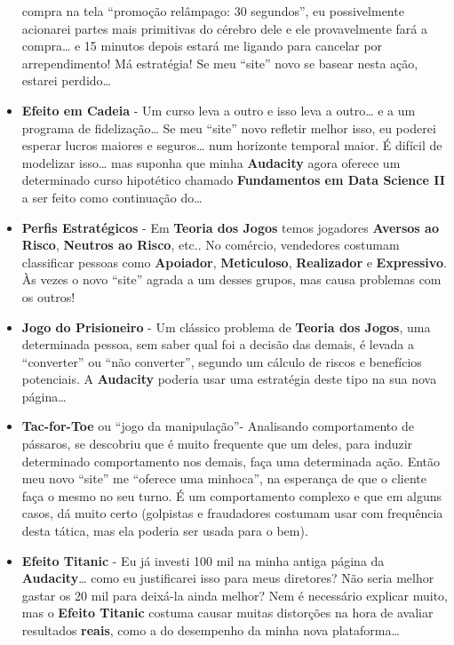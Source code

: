 \documentclass[11pt]{article}
\begin{document}
\begin{itemize}
  compra na tela ``promoção relâmpago: 30 segundos'', eu possivelmente
  acionarei partes mais primitivas do cérebro dele e ele provavelmente
  fará a compra\ldots{} e 15 minutos depois estará me ligando para
  cancelar por arrependimento! Má estratégia! Se meu ``site'' novo se
  basear nesta ação, estarei perdido\ldots{}
\item
  \textbf{Efeito em Cadeia} - Um curso leva a outro e isso leva a
  outro\ldots{} e a um programa de fidelização\ldots{} Se meu ``site''
  novo refletir melhor isso, eu poderei esperar lucros maiores e
  seguros\ldots{} num horizonte temporal maior. É difícil de modelizar
  isso\ldots{} mas suponha que minha \textbf{Audacity} agora oferece um
  determinado curso hipotético chamado \textbf{Fundamentos em Data
  Science II} a ser feito como continuação do\ldots{}
\item
  \textbf{Perfis Estratégicos} - Em \textbf{Teoria dos Jogos} temos
  jogadores \textbf{Aversos ao Risco}, \textbf{Neutros ao Risco}, etc..
  No comércio, vendedores costumam classificar pessoas como
  \textbf{Apoiador}, \textbf{Meticuloso}, \textbf{Realizador} e
  \textbf{Expressivo}. Às vezes o novo ``site'' agrada a um desses
  grupos, mas causa problemas com os outros!
\item
  \textbf{Jogo do Prisioneiro} - Um clássico problema de \textbf{Teoria
  dos Jogos}, uma determinada pessoa, sem saber qual foi a decisão das
  demais, é levada a ``converter'' ou ``não converter'', segundo um
  cálculo de riscos e benefícios potenciais. A \textbf{Audacity} poderia
  usar uma estratégia deste tipo na sua nova página\ldots{}
\item
  \textbf{Tac-for-Toe} ou ``jogo da manipulação''- Analisando
  comportamento de pássaros, se descobriu que é muito frequente que um
  deles, para induzir determinado comportamento nos demais, faça uma
  determinada ação. Então meu novo ``site'' me ``oferece uma minhoca'',
  na esperança de que o cliente faça o mesmo no seu turno. É um
  comportamento complexo e que em alguns casos, dá muito certo
  (golpistas e fraudadores costumam usar com frequência desta tática,
  mas ela poderia ser usada para o bem).
\item
  \textbf{Efeito Titanic} - Eu já investi 100 mil na minha antiga página
  da \textbf{Audacity}\ldots{} como eu justificarei isso para meus
  diretores? Não seria melhor gastar os 20 mil para deixá-la ainda
  melhor? Nem é necessário explicar muito, mas o \textbf{Efeito Titanic}
  costuma causar muitas distorções na hora de avaliar resultados
  \textbf{reais}, como a do desempenho da minha nova plataforma\ldots{}

\end{itemize}
\end{document}
